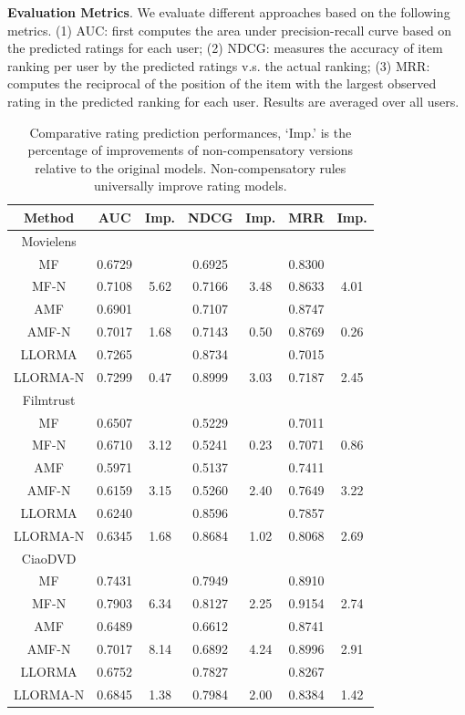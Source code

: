 \documentclass[letterpaper]{article} %
\begin{document}
\textbf{Evaluation Metrics}.  We evaluate different approaches based on the following metrics. (1) AUC: first computes the area under precision-recall curve based on the predicted ratings for each user; (2) NDCG: measures the accuracy of item ranking per user by the predicted ratings v.s. the actual ranking; (3)  MRR: computes the reciprocal of the position of the item with the largest observed rating in the predicted ranking for each user. Results are averaged over all users. 

\begin{table}[htp]
\caption{Comparative rating prediction performances, `Imp.' is the percentage of improvements of non-compensatory versions relative to the original models. Non-compensatory rules universally improve rating models.}
\scriptsize
\begin{center}
\begin{tabular}{c cc |cc |cc}
\hline
Method & AUC & Imp.& NDCG& Imp.& MRR &Imp.\\\hline
Movielens\\\hline
MF&0.6729 &&0.6925 &&0.8300 &\\
MF-N&0.7108 &5.62&0.7166 &3.48&0.8633 &4.01\\
AMF&0.6901 &&0.7107 &&0.8747 & \\
AMF-N&0.7017 &1.68&0.7143 &0.50&0.8769 &0.26\\
LLORMA&0.7265 &&0.8734 &&0.7015 &\\
LLORMA-N&0.7299 &0.47&0.8999 &3.03&0.7187 &2.45\\\hline
Filmtrust\\\hline
MF&0.6507 &&0.5229 &&0.7011 &\\
MF-N&0.6710 &3.12&0.5241 &0.23&0.7071 &0.86\\
AMF&0.5971 &&0.5137 &&0.7411 &\\
AMF-N&0.6159 &3.15&0.5260 &2.40&0.7649 &3.22\\
LLORMA&0.6240 &&0.8596 &&0.7857 &\\
LLORMA-N&0.6345 &1.68&0.8684 &1.02&0.8068 &2.69\\\hline
CiaoDVD\\\hline
MF&0.7431 &&0.7949 &&0.8910 &\\
MF-N&0.7903 &6.34&0.8127 &2.25&0.9154 &2.74\\
AMF&0.6489 &&0.6612 &&0.8741 & \\
AMF-N&0.7017 &8.14&0.6892 &4.24&0.8996 &2.91\\
LLORMA&0.6752 &&0.7827 &&0.8267 &\\
LLORMA-N&0.6845 &1.38&0.7984 &2.00&0.8384 &1.42\\
\hline
\end{tabular}
\end{center}
\label{tab:ratingresult}
\end{table}
\end{document}

